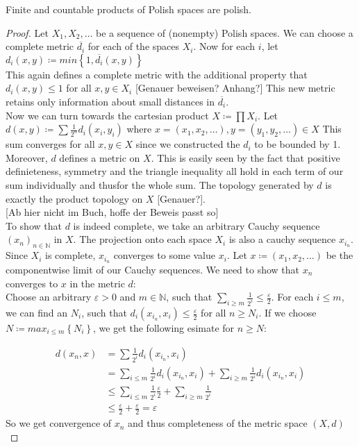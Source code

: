 \documentclass[10pt, a4paper, titlepage]{article}
\numberwithin{equation}{section}
\begin{document}
\begin{lemma}
	\label{products}
	Finite and countable products of Polish spaces are polish.
\end{lemma}
\begin{proof}
	Let $X_1,X_2,\ldots$ be a sequence of (nonempty) Polish spaces. We can choose a complete metric $\overline{d_i}$ for each of the spaces $X_i$. 
	Now for each $i$, let $d_i \left( x,y \right) \coloneq min \left\{ 1,\overline{d_i} \left( x,y \right)  \right\}$\\
	This again defines a complete metric with the additional property that $d_i\left( x,y \right) \leq 1$ for all $x,y \in X_i$ [Genauer beweisen? Anhang?]
This new metric retains only information about small distances in $\overline{d_i}$.\\
Now we can turn towards the cartesian product $X \coloneq \prod X_i$.
Let $d\left( x,y \right)\coloneq \sum \frac{1}{2^{n}} d_i\left( x_{i},y_{i} \right)$
where $x = \left( x_1,x_2,\ldots \right), y = \left( y_1,y_2,\ldots \right) \in X$ 
This sum converges for all $x,y \in X$ since we constructed the $d_i$ to be bounded by 1.
 Moreover, $d$ defines a metric on $X$. This is easily seen by the fact that positive definieteness, symmetry and the triangle inequality all hold in each term of our sum individually and thusfor the whole sum. 
 The topology generated by $d$ is exactly the product topology on $X$ [Genauer?].\\

[Ab hier nicht im Buch, hoffe der Beweis passt so] \\
To show that $d$ is indeed complete, we take an arbitrary Cauchy sequence $(x_{n})_{n \in  \mathbb{N}}$ in $X$. The projection onto each  space $X_i$ is also a cauchy sequence  $x_{i_n}$.
 Since $X_i$ is complete, $x_{i_n}$ converges to some value $x_i$. 
Let $x \coloneq \left( x_1,x_2,\ldots \right) $ be the componentwise limit of our Cauchy sequences. We need to show that $x_{n}$ converges to $x$ in the metric $d$:\\
Choose an arbitrary $\varepsilon > 0 $ and $m \in  \mathbb{N}$, such that $\sum_{i \geq m} \frac{1}{2^i} \leq \frac{\varepsilon}{2} $.
For each $i \leq m$, we can find an  $N_i$, such that $d_i\left( x_{i_n},x_i \right) \leq \frac{\varepsilon}{2}$ for all $n\geq N_i$. 
If we choose $N  \coloneq max_{i \leq m}\left\{ N_i \right\} $, we get the following esimate for $n \geq N$: 

\begin{align*}
	d\left( x_{n},x \right) &= \sum \frac{1}{2^i} d_i\left( x_{i_n},x_i \right)\\
				&= \sum_{i\leq m} \frac{1}{2^i} d_i\left( x_{i_n},x_i \right) + \sum_{i \geq m} \frac{1}{2^i} d_i\left( x_{i_n},x_i \right) \\
				&\leq \sum_{i \leq m} \frac{1}{2^i} \frac{\varepsilon}{2} + \sum_{i\geq m} \frac{1}{2^i} \\
				&\leq \frac{\varepsilon}{2} + \frac{\varepsilon}{2} = \varepsilon
\end{align*}
So we get convergence of $x_n$ and thus completeness of the metric space $\left( X,d \right) $ \\


\end{proof}
\end{document}
